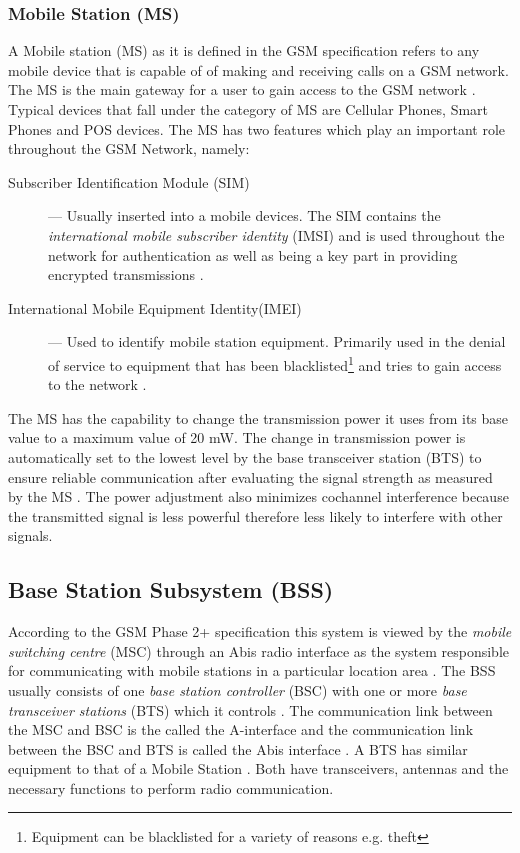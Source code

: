 \subsubsection{Mobile Station (MS)}
A Mobile station (MS) as it is defined in the GSM specification refers to any mobile device that is capable of of making and receiving calls on a GSM network.  The MS is the main gateway 
for a user to gain access to the GSM network \cite{Eisenblatter,GSMArchitectureProtocolsServices}. Typical devices that fall under the category of MS are Cellular Phones, Smart Phones and POS devices. The MS has two features which play an important role throughout the GSM Network, namely:
\begin{description}
\item[Subscriber Identification Module (SIM)] --- Usually inserted into a mobile devices. The SIM contains the \emph{international mobile subscriber identity} (IMSI) and is used throughout the network for authentication as well as being a key part in providing encrypted transmissions \cite{Eisenblatter}.
\item[International Mobile Equipment Identity(IMEI)] --- Used to identify mobile station equipment. Primarily used in the denial of service to equipment that has been blacklisted\footnote{Equipment can be blacklisted for a variety of reasons e.g. theft} and tries to gain access to the network \cite{Eisenblatter}.
\end{description}
The MS has the capability to change the transmission power it uses from its base value to a maximum value of 20 mW. The change in transmission power is automatically set to the lowest level by the base transceiver station (BTS) to ensure reliable communication after evaluating the signal strength as measured by the MS \cite{GSMSysEngin,GSMArchitectureProtocolsServices}. The power adjustment also minimizes cochannel interference because the transmitted signal is less powerful therefore less likely to interfere with other signals\cite{GSMSysEngin}.

\subsection{Base Station Subsystem (BSS)}

According to the GSM Phase 2+ specification this system is viewed by the \emph{mobile switching centre} (MSC) through an Abis radio interface as the system responsible for communicating with mobile stations in a particular location area \cite{Eisenblatter}. The BSS usually consists of one \emph{base station controller} (BSC) with one or more \emph{base transceiver stations} (BTS) which it controls \cite{Eisenblatter}. The communication link between the MSC and BSC is the called the A-interface and the communication link between the BSC and BTS is called the Abis interface \cite{Eisenblatter}. A BTS has similar equipment to that of a Mobile Station \cite{GSMSysEngin}. Both have transceivers, antennas and the necessary functions to perform radio communication. 

